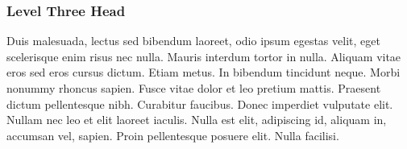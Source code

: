 \subsubsection{Level Three Head}

Duis malesuada, lectus sed bibendum laoreet, odio ipsum egestas
velit, eget scelerisque enim risus nec nulla. Mauris interdum
tortor in nulla. Aliquam vitae eros sed eros cursus dictum. Etiam
metus. In bibendum tincidunt neque. Morbi nonummy rhoncus sapien.
Fusce vitae dolor et leo pretium mattis. Praesent dictum
pellentesque nibh. Curabitur faucibus. Donec imperdiet vulputate
elit. Nullam nec leo et elit laoreet iaculis. Nulla est elit,
adipiscing id, aliquam in, accumsan vel, sapien. Proin
pellentesque posuere elit. Nulla facilisi.
